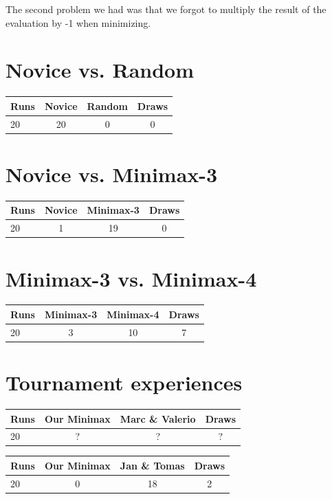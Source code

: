 \documentclass{scrartcl}
\begin{document}
The second problem we had was that we forgot to multiply the result of the evaluation by -1 when minimizing.

\section{Novice vs. Random}

\begin{tabular}{l c c c}
Runs & Novice & Random & Draws \\
\hline
20 & 20 & 0 & 0  \\
\end{tabular}

\section{Novice vs. Minimax-3}

\begin{tabular}{l c c c}
Runs & Novice & Minimax-3 & Draws \\
\hline
20 & 1 & 19 & 0  \\
\end{tabular}

\section{Minimax-3 vs. Minimax-4}

\begin{tabular}{l c c c}
Runs & Minimax-3 & Minimax-4 & Draws \\
\hline
20 & 3 & 10 & 7  \\
\end{tabular}

\section{Tournament experiences}

\begin{tabular}{l c c c}
Runs & Our Minimax & Marc \& Valerio & Draws \\
\hline
20 & ? & ? & ?  \\
\end{tabular}

\begin{tabular}{l c c c}
Runs & Our Minimax & Jan \& Tomas & Draws \\
\hline
20 & 0 & 18 & 2  \\
\end{tabular}
\end{document}
